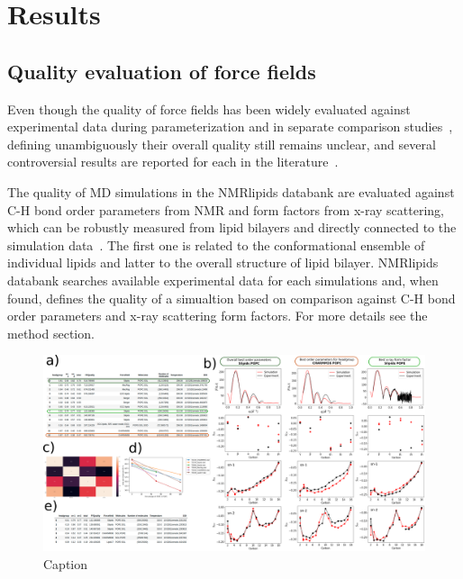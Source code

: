 \documentclass[fleqn,10pt]{wlscirep}
\begin{document}
\section{Results}


\subsection{Quality evaluation of force fields}
Even though the quality of force fields has been widely evaluated against experimental data during parameterization and in separate comparison studies~\cite{botan15,ollila16,catte16,pluhackova16,perez17,leonard19}, defining unambiguously their overall quality still remains unclear, and several controversial results are reported for each in the literature~\cite{antila22b}.

The quality of MD simulations in the NMRlipids databank are evaluated against C-H bond order parameters from NMR and form factors from x-ray scattering, which can be robustly measured from lipid bilayers and directly connected to the simulation data~\cite{ollila16}. The first one is related to the conformational ensemble of individual lipids and latter to the overall structure of lipid bilayer. NMRlipids databank searches available experimental data for each simulations and, when found, defines the quality of a simualtion based on comparison against C-H bond order parameters and x-ray scattering form factors. For more details see the method section.

\begin{figure}
    \centering
    \includegraphics[width=180mm]{Figures/quality.pdf}
    \caption{Caption}
    \label{fig:quality}
\end{figure}
\end{document}
